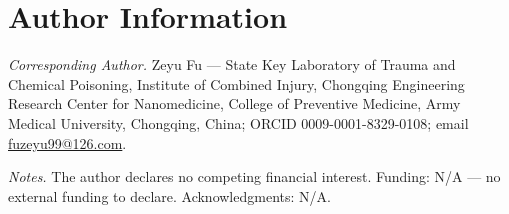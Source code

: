 \documentclass[journal=jprobs,manuscript=article,hyperref,doi=true]{achemso}
\begin{document}






\section*{Author Information}

\noindent\textit{Corresponding Author.}
Zeyu Fu --- State Key Laboratory of Trauma and Chemical Poisoning, Institute of Combined Injury, Chongqing
Engineering Research Center for Nanomedicine, College of Preventive Medicine, Army Medical University, Chongqing,
China; ORCID 0009-0001-8329-0108; email \href{mailto:fuzeyu99@126.com}{fuzeyu99@126.com}.

\noindent\textit{Notes.}
The author declares no competing financial interest. Funding: N/A --- no external funding to declare.
Acknowledgments: N/A.


\end{document}

